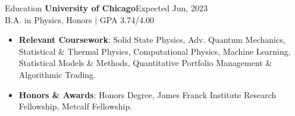 \documentclass{resume} %
\begin{document}
\vspace{-0.6em}
\begin{rSection}{Education}
{\bf University of Chicago}\hfill {Expected Jun, 2023}\\
B.A. in Physics, Honors $|$ GPA 3.74/4.00\\
\vspace{-1.5em}
\begin{itemize}
   \itemsep -5.8pt {}
   \item \textbf{Relevant Coursework}: Solid State Physics, Adv. Quantum Mechanics, Statistical \& Thermal Physics, Computational Physics, Machine Learning, Statistical Models \& Methods, Quantitative Portfolio Management \& Algorithmic Trading.
   \item \textbf{Honors \& Awards}: Honors Degree, James Franck Institute Research Fellowship, Metcalf Fellowship.
\end{itemize}




\end{rSection}
\end{document}
